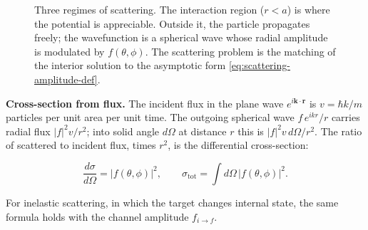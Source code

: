 \begin{figure}[htbp!]
\centering
{}
\caption{Three regimes of scattering. The interaction region ($r<a$) is where the potential is appreciable. Outside it, the particle propagates freely; the wavefunction is a spherical wave whose radial amplitude is modulated by $f(\theta,\phi)$. The scattering problem is the matching of the interior solution to the asymptotic form \eqref{eq:scattering-amplitude-def}.}
\label{fig:interaction-region}
\end{figure}

\medskip\noindent\textbf{Cross-section from flux.}
The incident flux in the plane wave $e^{i\bm k\cdot\bm r}$ is $v=\hbar k/m$ particles per unit area per unit time. The outgoing spherical wave $f\,e^{ikr}/r$ carries radial flux $|f|^{2}v/r^{2}$; into solid angle $d\Omega$ at distance $r$ this is $|f|^{2}v\,d\Omega/r^{2}$. The ratio of scattered to incident flux, times $r^{2}$, is the differential cross-section:
\begin{linenomath}
\begin{equation}
\frac{d\sigma}{d\Omega}=|f(\theta,\phi)|^{2},\qquad
\sigma_{\mathrm{tot}}=\int d\Omega\,|f(\theta,\phi)|^{2}.
\label{eq:differential-cross-section}
\end{equation}
\end{linenomath}
For inelastic scattering, in which the target changes internal state, the same formula holds with the channel amplitude $f_{i\to f}$.


